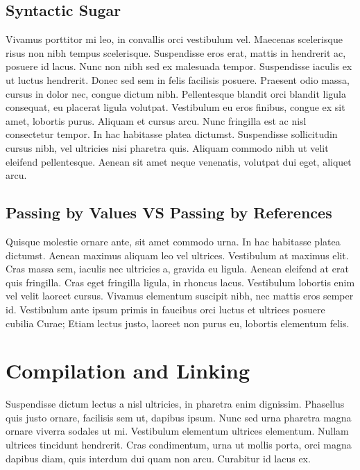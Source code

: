 \subsection{Syntactic Sugar}
Vivamus porttitor mi leo, in convallis orci vestibulum vel. Maecenas scelerisque risus non nibh tempus scelerisque. Suspendisse eros erat, mattis in hendrerit ac, posuere id lacus. Nunc non nibh sed ex malesuada tempor. Suspendisse iaculis ex ut luctus hendrerit. Donec sed sem in felis facilisis posuere. Praesent odio massa, cursus in dolor nec, congue dictum nibh. Pellentesque blandit orci blandit ligula consequat, eu placerat ligula volutpat. Vestibulum eu eros finibus, congue ex sit amet, lobortis purus. Aliquam et cursus arcu. Nunc fringilla est ac nisl consectetur tempor. In hac habitasse platea dictumst. Suspendisse sollicitudin cursus nibh, vel ultricies nisi pharetra quis. Aliquam commodo nibh ut velit eleifend pellentesque. Aenean sit amet neque venenatis, volutpat dui eget, aliquet arcu.

\subsection{Passing by Values VS Passing by References}
Quisque molestie ornare ante, sit amet commodo urna. In hac habitasse platea dictumst. Aenean maximus aliquam leo vel ultrices. Vestibulum at maximus elit. Cras massa sem, iaculis nec ultricies a, gravida eu ligula. Aenean eleifend at erat quis fringilla. Cras eget fringilla ligula, in rhoncus lacus. Vestibulum lobortis enim vel velit laoreet cursus. Vivamus elementum suscipit nibh, nec mattis eros semper id. Vestibulum ante ipsum primis in faucibus orci luctus et ultrices posuere cubilia Curae; Etiam lectus justo, laoreet non purus eu, lobortis elementum felis.


\section{Compilation and Linking}
Suspendisse dictum lectus a nisl ultricies, in pharetra enim dignissim. Phasellus quis justo ornare, facilisis sem ut, dapibus ipsum. Nunc sed urna pharetra magna ornare viverra sodales ut mi. Vestibulum elementum ultrices elementum. Nullam ultrices tincidunt hendrerit. Cras condimentum, urna ut mollis porta, orci magna dapibus diam, quis interdum dui quam non arcu. Curabitur id lacus ex.

